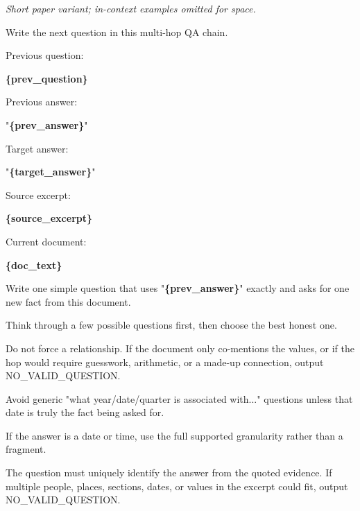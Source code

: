 \begin{tcolorbox}[colback=white, colframe=my-green, coltitle=black, parskip=5mm, title=\textbf{Next-Hop Question, Fixed Target (Short)}, halign=flush left, enhanced, breakable, skin first=enhanced, skin middle=enhanced, skin last=enhanced]
\begin{scriptsize}
\ttfamily
\setlength{\parindent}{0pt}
\normalfont\textit{Short paper variant; in-context examples omitted for space.}\par
\medskip
\ttfamily
Write the next question in this multi-hop QA chain.\par
\mbox{}\par
Previous question:\par
\textcolor{my-green}{\textbf{\{prev\_question\}}}\par
\mbox{}\par
Previous answer:\par
"\textcolor{my-green}{\textbf{\{prev\_answer\}}}"\par
\mbox{}\par
Target answer:\par
"\textcolor{my-green}{\textbf{\{target\_answer\}}}"\par
\mbox{}\par
Source excerpt:\par
\textcolor{my-green}{\textbf{\{source\_excerpt\}}}\par
\mbox{}\par
Current document:\par
\textcolor{my-green}{\textbf{\{doc\_text\}}}\par
\mbox{}\par
Write one simple question that uses "\textcolor{my-green}{\textbf{\{prev\_answer\}}}" exactly and asks for one new fact from this document.\par
Think through a few possible questions first, then choose the best honest one.\par
Do not force a relationship. If the document only co-mentions the values, or if the hop would require guesswork, arithmetic, or a made-up connection, output NO\_VALID\_QUESTION.\par
Avoid generic "what year/date/quarter is associated with..." questions unless that date is truly the fact being asked for.\par
If the answer is a date or time, use the full supported granularity rather than a fragment.\par
The question must uniquely identify the answer from the quoted evidence. If multiple people, places, sections, dates, or values in the excerpt could fit, output NO\_VALID\_QUESTION.\par

\end{scriptsize}
\end{tcolorbox}
